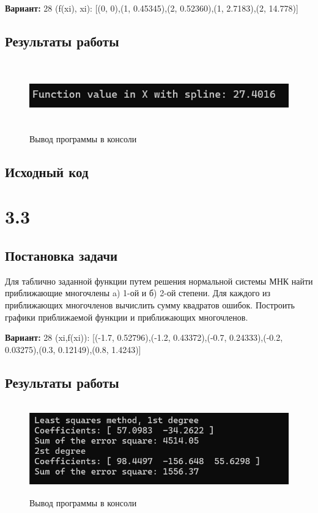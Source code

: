 {\bfseries Вариант:} 28
(f(xi), xi): [(0, 0),(1, 0.45345),(2, 0.52360),(1, 2.7183),(2, 14.778)]

\subsection{Результаты работы}
\begin{figure}[h!]
\centering
\includegraphics[width=15cm, height=3cm]{img/img2_2}
\caption{Вывод программы в консоли}
\end{figure}
\pagebreak

\subsection{Исходный код}


\pagebreak

\section* {3.3}

\subsection{Постановка задачи}
Для таблично заданной функции путем решения нормальной системы МНК найти приближающие многочлены a) 1-ой  и б) 2-ой степени. Для каждого из приближающих многочленов вычислить сумму квадратов ошибок. Построить графики приближаемой функции и приближающих многочленов.

{\bfseries Вариант:} 28
(xi,f(xi)): [(-1.7, 0.52796),(-1.2, 0.43372),(-0.7, 0.24333),(-0.2, 0.03275),(0.3, 0.12149),(0.8, 1.4243)]

\subsection{Результаты работы}
\begin{figure}[h!]
\centering
\includegraphics[width=15cm, height=4cm]{img/img3_2}
\caption{Вывод программы в консоли}
\end{figure}
\pagebreak

